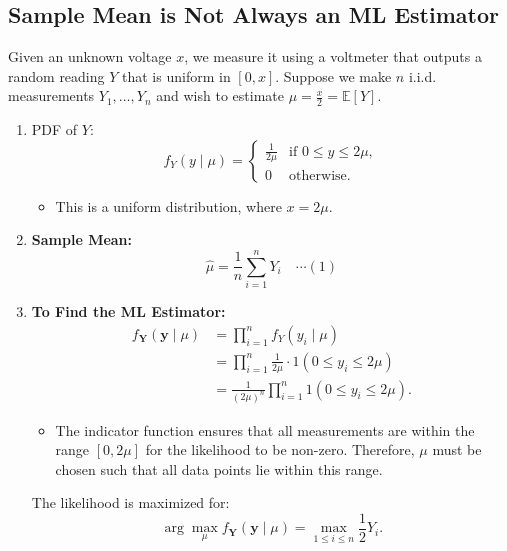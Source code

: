\subsection{Sample Mean is Not Always an ML Estimator}
\begin{example}
    Given an unknown voltage \( x \), we measure it using a voltmeter that outputs a random reading \( Y \) that is uniform in \( [0, x] \). Suppose we make \( n \) i.i.d. measurements \( Y_1, \dots, Y_n \) and wish to estimate \( \mu = \frac{x}{2} = \mathbb{E}[Y] \).
    \begin{enumerate}
        \item PDF of \( Y \):
        \begin{equation*}
            f_Y(y \mid \mu) = 
            \begin{cases}
                \frac{1}{2\mu} & \text{if } 0 \leq y \leq 2\mu, \\
                0 & \text{otherwise}.
            \end{cases}
        \end{equation*}
        \begin{itemize}
            \item This is a uniform distribution, where $x = 2\mu$. 
        \end{itemize}
        \item \textbf{Sample Mean:} 
        \[
        \hat{\mu} = \frac{1}{n} \sum_{i=1}^n Y_i \quad \cdots (1)
        \]

        \item \textbf{To Find the ML Estimator:}
        \begin{align*}
            f_{\mathbf{Y}}(\mathbf{y} \mid \mu) &= \prod_{i=1}^n f_Y(y_i \mid \mu) \\
            &= \prod_{i=1}^n \frac{1}{2\mu} \cdot 1(0 \leq y_i \leq 2\mu) \\
            &= \frac{1}{(2\mu)^n} \prod_{i=1}^n 1(0 \leq y_i \leq 2\mu).
        \end{align*}
        \begin{itemize}
            \item The indicator function ensures that all measurements are within the range \( [0, 2\mu] \) for the likelihood to be non-zero. Therefore, $\mu$ must be chosen such that all data points lie within this range.
        \end{itemize}
        
        The likelihood is maximized for:
        \[
        \arg\max_{\mu} f_{\mathbf{Y}}(\mathbf{y} \mid \mu) = \max_{1 \leq i \leq n} \frac{1}{2} Y_i.
        \]


\end{enumerate}
\end{example}
